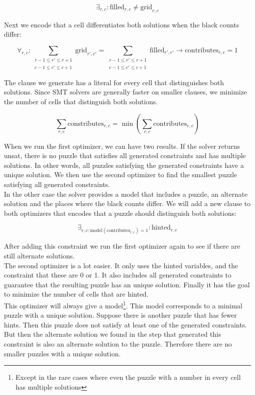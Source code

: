 \documentclass{scrartcl}
\begin{document}
	$$\exists_{r,c}:  \text{filled}_{r,c} \ne \text{grid}_{r,c}$$

	Next we encode that a cell differentiates both solutions when the black counts differ:

	$$\forall_{r,c}: \sum_{\substack{r-1\le r' \le r+1\\c-1\le c'\le c+1}}\text{grid}_{r',c'} = \sum_{\substack{r-1\le r' \le r+1\\c-1\le c'\le c+1}}\text{filled}_{r',c'}\to \text{contributes}_{r,c}=1$$

	The clause we generate has a literal for every cell that distinguishes both solutions. Since SMT solvers are generally faster on smaller clauses, we minimize the number of cells that distinguish both solutions.

	$$\sum_{r,c}\text{constributes}_{r,c} = \min_{}(\sum_{r,c}\text{contributes}_{r,c}
	)$$

	When we run the first optimizer, we can have two results.
	If the solver returns unsat, there is no puzzle that satisfies all generated constraints and has multiple solutions. In other words, all puzzles satisfying the generated constraints have a unique solution. We then use the second optimizer to find the smallest puzzle satisfying all generated constraints.\\

	In the other case the solver provides a model that includes a puzzle, an alternate solution and the places where the black counts differ. We will add a new clause to both optimizers that encodes that a puzzle should distinguish both solutions:

	$$\exists_{r,c : \text{model}(\text{contributes}_{r,c})=1}: \text{hinted}_{r,c}$$

	After adding this constraint we run the first optimizer again to see if there are still alternate solutions.\\

	The second optimizer is a lot easier.
	It only uses the hinted variables, and the constraint that these are 0 or 1.
	It also includes all generated constraints to guarantee that the resulting puzzle has an unique solution.
	Finally it has the goal to minimize the number of cells that are hinted.\\

	This optimizer will always give a model\footnote{Except in the rare cases where even the puzzle with a number in every cell has multiple solutions}.
	This model corresponds to a minimal puzzle with a unique solution. Suppose there is another puzzle that has fewer hints. Then this puzzle does not satisfy at least one of the generated constraints. But then the alternate solution we found in the step that generated this constraint is also an alternate solution to the puzzle. Therefore there are no smaller puzzles with a unique solution.
\end{document}
